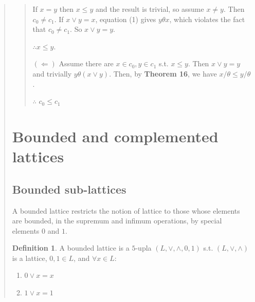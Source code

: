 \documentclass[a4paper, 12pt]{article}
\theoremstyle{definition}
\theoremstyle{definition}
\theoremstyle{definition}
\newtheorem{definition}{Definition}
\begin{document}
\begin{quote}
\begin{quote}
If $x = y$ then $x \leq y$ and the result is trivial, so assume $x \neq y$.
Then $c_0 \neq c_1$.  If $x \lor  y = x$, equation (1) gives $y \theta x$,
which violates the fact that $c_0 \neq c_1$. So $x \lor  y = y$. 

$\therefore x \leq y$.

$(\Leftarrow)$ Assume there are $x \in c_0, y \in c_1 $ s.t. $x \leq y$.
Then $x\lor  y = y$ and trivially $y\theta(x \lor y)$.
Then, by \textbf{Theorem 16}, we have $x / \theta \leq y / \theta$.

$\therefore $ $c_0 \leq c_1$

\end{quote}
\normalsize


\pagebreak 
{}
\section{Bounded and complemented lattices}

\subsection{Bounded sub-lattices}

A bounded lattice restricts the notion of lattice to those 
whose elements are bounded, in the supremum and infimum operations, 
by special elements $0$ and $1$.

\begin{definition}
    A bounded lattice is a $5$-upla $(L, \lor, \land, 0, 1)$ s.t. $(L, \lor, \land)$ is a lattice, $0, 1 \in L$, and $\forall x \in L:$

    \begin{enumerate}
        \item $0 \lor x = x$
        \item $1 \lor  x = 1$
    \end{enumerate}
\end{definition}




\end{quote}
\end{document}
